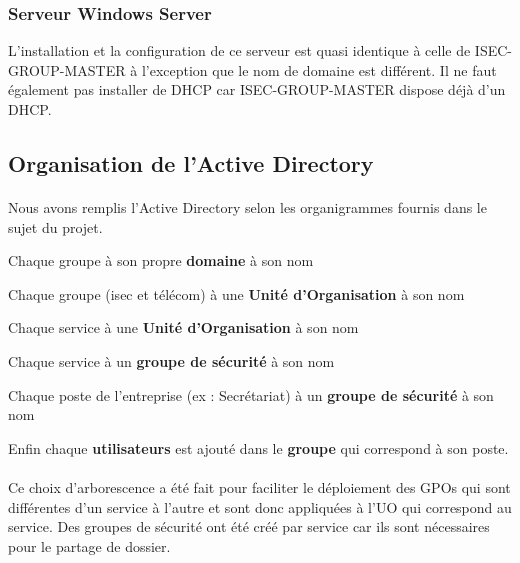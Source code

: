 		\subsubsection{Serveur Windows Server}

		L’installation et la configuration de ce serveur est quasi identique à celle de ISEC-GROUP-MASTER à l’exception que le nom de domaine est différent. Il ne faut également pas installer de DHCP car ISEC-GROUP-MASTER dispose déjà d’un DHCP.


	\subsection{Organisation de l'Active Directory}	
		\paragraph{}
			Nous avons remplis l'Active Directory selon les organigrammes fournis dans le sujet du projet. 

		\begin{description}
			\item Chaque groupe à son propre \textbf{domaine} à son nom
			\item Chaque groupe (isec et télécom) à une \textbf{Unité d'Organisation} à son nom
			\item Chaque service à une \textbf{Unité d'Organisation} à son nom
			\item Chaque service à un \textbf{groupe de sécurité} à son nom 
			\item Chaque poste de l'entreprise (ex : Secrétariat) à un \textbf{groupe de sécurité} à son nom
			\item Enfin chaque \textbf{utilisateurs} est ajouté dans le \textbf{groupe} qui correspond à son poste. 
		\end{description}

		\paragraph{}
			Ce choix d'arborescence a été fait pour faciliter le déploiement des GPOs qui sont différentes d'un service à l'autre et sont donc appliquées à l'UO qui correspond au service. Des groupes de sécurité ont été créé par service car ils sont nécessaires pour le partage de dossier. 

